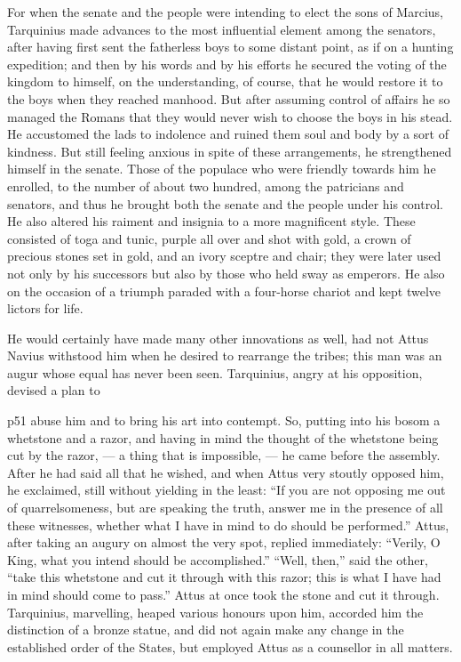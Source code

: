 For when the senate and the people were intending to elect the sons of Marcius, Tarquinius made advances to the most influential element among the senators, after having first sent the fatherless boys to some distant point, as if on a hunting expedition; and then by his words and by his efforts he secured the voting of the kingdom to himself, on the understanding, of course, that he would restore it to the boys when they reached manhood. But after assuming control of affairs he so managed the Romans that they would never wish to choose the boys in his stead. He accustomed the lads to indolence and ruined them soul and body by a sort of kindness. But still feeling anxious in spite of these arrangements, he strengthened himself in the senate. Those of the populace who were friendly towards him he enrolled, to the number of about two hundred, among the patricians and senators, and thus he brought both the senate and the people under his control. He also altered his raiment and insignia to a more magnificent style. These consisted of toga and tunic, purple all over and shot with gold, a crown of precious stones set in gold, and an ivory sceptre and chair; they were later used not only by his successors but also by those who held sway as emperors. He also on the occasion of a triumph paraded with a four-horse chariot and kept twelve lictors for life.

He would certainly have made many other innovations as well, had not Attus Navius withstood him when he desired to rearrange the tribes; this man was an augur whose equal has never been seen. Tarquinius, angry at his opposition, devised a plan to

p51 abuse him and to bring his art into contempt. So, putting into his bosom a whetstone and a razor, and having in mind the thought of the whetstone being cut by the razor, \texthebrew{—} a thing that is impossible, \texthebrew{—} he came before the assembly. After he had said all that he wished, and when Attus very stoutly opposed him, he exclaimed, still without yielding in the least: ``If you are not opposing me out of quarrelsomeness, but are speaking the truth, answer me in the presence of all these witnesses, whether what I have in mind to do should be performed.'' Attus, after taking an augury on almost the very spot, replied immediately: ``Verily, O King, what you intend should be accomplished.'' ``Well, then,'' said the other, ``take this whetstone and cut it through with this razor; this is what I have had in mind should come to pass.'' Attus at once took the stone and cut it through. Tarquinius, marvelling, heaped various honours upon him, accorded him the distinction of a bronze statue, and did not again make any change in the established order of the States, but employed Attus as a counsellor in all matters.

